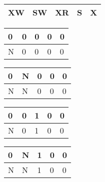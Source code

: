 
%
%
%

\renewcommand{\basename}{WHAT}
\renewcommand{\dirname}{notes/FIXMEwheretodirname/}



\beginArtNoToc

\generatetitle{}
\label{chap:\basename}

\begin{tabular}{ | l | l | l | l | l |}
\hline
XW & SW & XR & S & X \\
\hline
\end{tabular}\par

\qquad\begin{tabular}{ | l | l | l | l | l |}
\hline
0 & 0 & 0 & 0 & 0 \\
\hline
N & 0 & 0 & 0 & 0 \\
\hline
\end{tabular}
\qquad\begin{tabular}{ | l | l | l | l | l |}
\hline
0 & N & 0 & 0 & 0 \\
\hline
N & N & 0 & 0 & 0 \\
\hline
\end{tabular}
\qquad\begin{tabular}{ | l | l | l | l | l |}
\hline
0 & 0 & 1 & 0 & 0 \\
\hline
N & 0 & 1 & 0 & 0 \\
\hline
\end{tabular}
\qquad\begin{tabular}{ | l | l | l | l | l |}
\hline
0 & N & 1 & 0 & 0 \\
\hline
N & N & 1 & 0 & 0 \\
\hline
\end{tabular}\par

